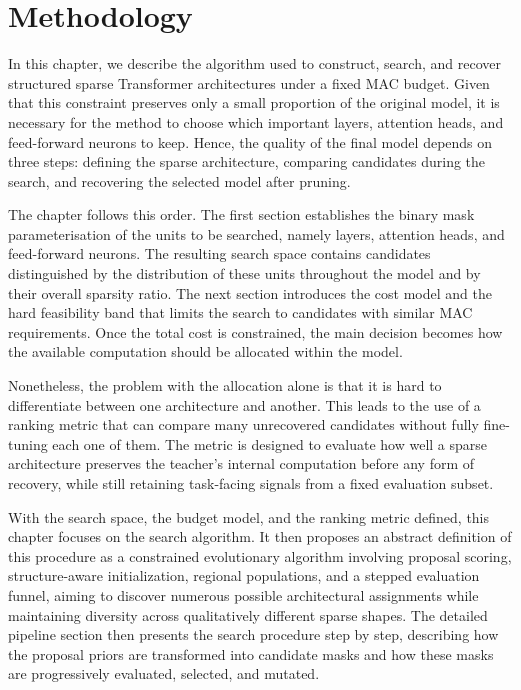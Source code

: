 \documentclass[11pt,a4paper,openany]{book}
\theoremstyle{definition}
\theoremstyle{remark}
\begin{document}
\chapter{Methodology}

In this chapter, we describe the algorithm used to construct, search, and recover structured sparse Transformer architectures under a fixed MAC budget. Given that this constraint preserves only a small proportion of the original model, it is necessary for the method to choose which important layers, attention heads, and feed-forward neurons to keep. Hence, the quality of the final model depends on three steps: defining the sparse architecture, comparing candidates during the search, and recovering the selected model after pruning.

The chapter follows this order. The first section establishes the binary mask parameterisation of the units to be searched, namely layers, attention heads, and feed-forward neurons. The resulting search space contains candidates distinguished by the distribution of these units throughout the model and by their overall sparsity ratio. The next section introduces the cost model and the hard feasibility band that limits the search to candidates with similar MAC requirements. Once the total cost is constrained, the main decision becomes how the available computation should be allocated within the model.

Nonetheless, the problem with the allocation alone is that it is hard to differentiate between one architecture and another. This leads to the use of a ranking metric that can compare many unrecovered candidates without fully fine-tuning each one of them. The metric is designed to evaluate how well a sparse architecture preserves the teacher's internal computation before any form of recovery, while still retaining task-facing signals from a fixed evaluation subset.

With the search space, the budget model, and the ranking metric defined, this chapter focuses on the search algorithm. It then proposes an abstract definition of this procedure as a constrained evolutionary algorithm involving proposal scoring, structure-aware initialization, regional populations, and a stepped evaluation funnel, aiming to discover numerous possible architectural assignments while maintaining diversity across qualitatively different sparse shapes. The detailed pipeline section then presents the search procedure step by step, describing how the proposal priors are transformed into candidate masks and how these masks are progressively evaluated, selected, and mutated.
\end{document}
